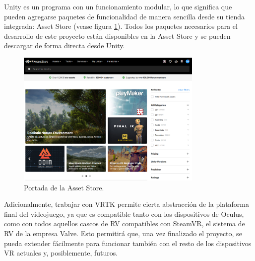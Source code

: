 Unity es un programa con un funcionamiento modular, lo que significa que pueden agregarse paquetes de funcionalidad de manera sencilla desde su tienda integrada: Asset Store (vease figura \ref{fig:TU_assetStore}). Todos los paquetes necesarios para el desarrollo de este proyecto están disponibles en la Asset Store y se pueden descargar de forma directa desde Unity.

\begin{figure}[H]
  \centering
\includegraphics[width=0.8\textwidth]{03.EstudioProblema/03.TecnologiaAUsar/00.Figuras/03.asset_store.png}
    \caption{Portada de la Asset Store.}
    \label{fig:TU_assetStore}
\end{figure}



Adicionalmente, trabajar con VRTK permite cierta abstracción de la plataforma final del videojuego, ya que es compatible tanto con los dispositivos de Oculus, como con todos aquellos cascos de RV compatibles con SteamVR, el sistema de RV de la empresa Valve. Esto permitirá que, una vez finalizado el proyecto, se pueda extender fácilmente para funcionar también con el resto de los dispositivos VR actuales y, posiblemente, futuros.


\chapterend